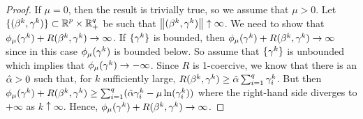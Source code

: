 %
\begin{proof}
If $\mu=0$, then the result is trivially true, so we assume that $\mu>0$.
Let $\{(\beta^k,\gamma^k)\}\subset {\operatorname{\mathbb{R}}^p}\times\operatorname{\mathbb{R}}^q_+$ be such that $\left\Vert (\beta^k,\gamma^k)\right\Vert\uparrow\infty$.
We need to show that $\phi_\mu(\gamma^k)+R(\beta^k,\gamma^k)\rightarrow \infty$.
If $\{\gamma^k\}$ is bounded, then $\phi_\mu(\gamma^k)+R(\beta^k,\gamma^k)\rightarrow \infty$
since in this case $\phi_\mu(\gamma^k)$ is bounded below.
So assume that $\{\gamma^k\}$ is unbounded which implies that
$\phi_\mu(\gamma^k)\rightarrow -\infty$. Since $R$ is 1-coercive,
we know that there is an $\hat{\alpha}>0$ such that, for $k$ sufficiently large,
$R(\beta^k,\gamma^k)\ge\hat{\alpha}\sum_{i=1}^q\gamma^k_i$. But then
$\phi_\mu(\gamma^k)+R(\beta^k,\gamma^k)\ge \sum_{i=1}^q(\hat{\alpha}\gamma^k_i-\mu\ln(\gamma^k_i))$
where the right-hand side diverges to $+\infty$ as $k\uparrow\infty$.
Hence, $\phi_\mu(\gamma^k)+R(\beta^k,\gamma^k)\rightarrow \infty$.
\end{proof}



